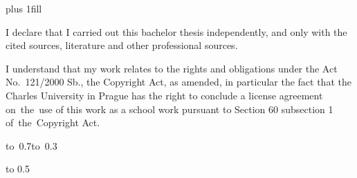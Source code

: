 \newpage



\openright
\hypersetup{pageanchor=true}
\pagestyle{plain}
\vglue 0pt plus 1fill

\noindent
I declare that I carried out this bachelor thesis independently, and only with the cited
sources, literature and other professional sources.

\medskip\noindent
I understand that my work relates to the rights and obligations under the Act No.~121/2000 Sb.,
the Copyright Act, as amended, in particular the fact that the Charles
University in Prague has the right to conclude a license agreement on~the~use of this
work as a school work pursuant to Section 60 subsection 1 of~the~Copyright Act.

\vspace{20mm}

\hbox{\hbox to 0.7\hbox to 0.3}

\vspace{20mm}
\newpage


\openright

\vbox to 0.5

\newpage


\openright

\noindent
\Dedication

\newpage

\openright
\pagestyle{plain}
\setcounter{page}{1}
